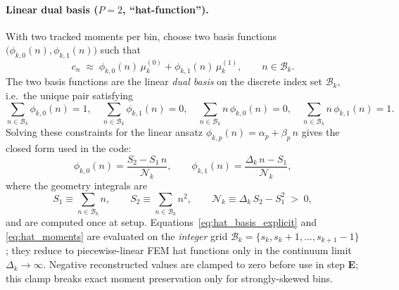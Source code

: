 \paragraph{Linear dual basis ($P{=}2$, ``hat-function'').}
\label{sec:bin_galerkin}
With two tracked moments per bin, choose two basis functions
$\bigl(\phi_{k,0}(n), \phi_{k,1}(n)\bigr)$ such that
\begin{equation}\label{eq:shape_ansatz}
    c_n \;\approx\; \phi_{k,0}(n)\,\mu_k^{(0)}
                  + \phi_{k,1}(n)\,\mu_k^{(1)},
    \qquad n \in \mathcal{B}_k.
\end{equation}
The two basis functions are the linear \emph{dual basis} on the
discrete index set $\mathcal{B}_k$, i.e.\ the unique pair satisfying
\begin{equation}\label{eq:dual_basis_conditions}
  \sum_{n \in \mathcal{B}_k} \phi_{k,0}(n) = 1,
  \quad
  \sum_{n \in \mathcal{B}_k} \phi_{k,1}(n) = 0,
  \quad
  \sum_{n \in \mathcal{B}_k} n\,\phi_{k,0}(n) = 0,
  \quad
  \sum_{n \in \mathcal{B}_k} n\,\phi_{k,1}(n) = 1.
\end{equation}
Solving these constraints for the linear ansatz
$\phi_{k,p}(n) = \alpha_p + \beta_p\,n$ gives the closed form used in
the code:
\begin{equation}\label{eq:hat_basis_explicit}
    \phi_{k,0}(n) = \frac{S_2 - S_1\,n}{\mathcal{N}_k},
    \qquad
    \phi_{k,1}(n) = \frac{\Delta_k\,n - S_1}{\mathcal{N}_k},
\end{equation}
where the geometry integrals are
\begin{equation}\label{eq:hat_moments}
    S_1 \equiv \sum_{n \in \mathcal{B}_k} n,
    \qquad
    S_2 \equiv \sum_{n \in \mathcal{B}_k} n^2,
    \qquad
    \mathcal{N}_k \equiv \Delta_k\,S_2 - S_1^2 \;>\; 0,
\end{equation}
and are computed once at setup. Equations~\eqref{eq:hat_basis_explicit}
and \eqref{eq:hat_moments} are evaluated on the \emph{integer} grid
$\mathcal{B}_k = \{s_k, s_k+1, \ldots, s_{k+1}-1\}$; they reduce to
piecewise-linear FEM hat functions only in the continuum limit
$\Delta_k \to \infty$. Negative reconstructed values are clamped to
zero before use in step \textbf{E}; this clamp breaks exact moment
preservation only for strongly-skewed bins.

